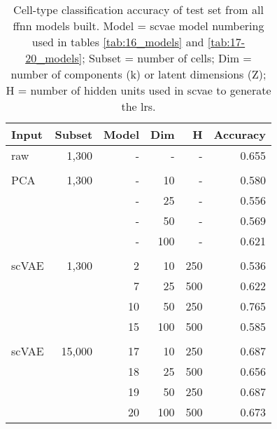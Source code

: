 \documentclass{article}
\begin{document}
\begin{table}[htp]
\centering
\caption{\small{Cell-type classification accuracy of test set from all \gls{ffnn} models built.
Model = \gls{scvae} model numbering used in tables
\ref{tab:16_models} and \ref{tab:17-20_models};
Subset = number of cells;
Dim = number of components (k) or latent dimensions (Z); 
H = number of hidden units used in \gls{scvae} to generate the \glspl{lr}.}}

\vspace{0.4cm}
\small
\begin{tabular}{lrrrrr} 
\hline
\multicolumn{1}{l}{Input} & \multicolumn{1}{r}{Subset} & \multicolumn{1}{r}{Model} & \multicolumn{1}{r}{Dim} & \multicolumn{1}{r}{H} & \multicolumn{1}{r}{Accuracy}  \\ 
\hline
raw  & 1,300   & -    & -    & -   & 0.655    \\
 &    &     &    &    &     \\
PCA  & 1,300    & -    & 10   & -   & 0.580    \\
     &               & -    & 25   & -   & 0.556     \\
     &               & -    & 50   & -   & 0.569    \\
     &               & -    & 100  & -   & 0.621     \\
      &    &     &    &    &     \\
scVAE  & 1,300 & 2    & 10   & 250 & 0.536      \\
       &             & 7    & 25   & 500 & 0.622     \\
       &             & 10   & 50   & 250 & 0.765      \\
       &             & 15   & 100  & 500 & 0.585    \\
        &    &     &    &    &     \\
scVAE       & 15,000  & 17 & 10   & 250 & 0.687       \\
       &               & 18 & 25   & 500 & 0.656      \\
       &               & 19 & 50   & 250 & 0.687      \\
       &               & 20 & 100  & 500 & 0.673       \\
\hline
\end{tabular}
\label{tab:ffnn_accuracies}
\end{table}
\end{document}
